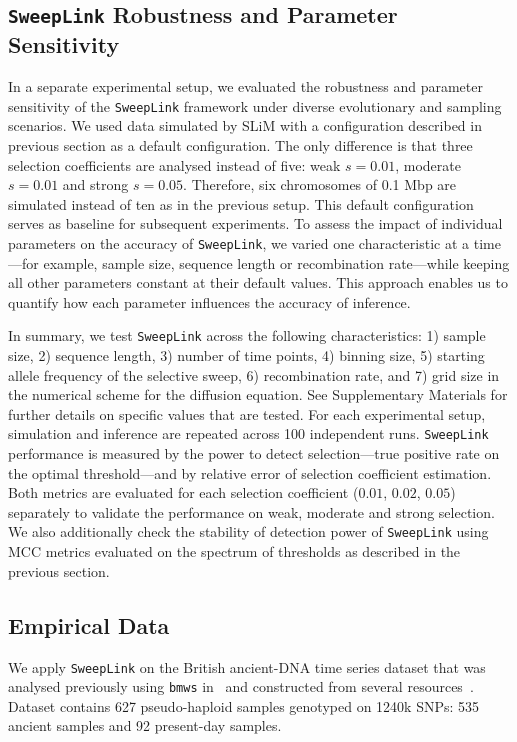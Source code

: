 \documentclass{article}
\newcommand{\SweepLink}{\texttt{SweepLink}\xspace}
\newcommand{\bmws}{\texttt{bmws}\xspace}
\begin{document}
\subsection{\SweepLink Robustness and Parameter Sensitivity}

In a separate experimental setup, we evaluated the robustness and parameter sensitivity of the \SweepLink framework under diverse evolutionary and sampling scenarios.
We used data simulated by SLiM with a configuration described in previous section as a default configuration.
The only difference is that three selection coefficients are analysed instead of five: weak $s=0.01$, moderate $s=0.01$ and strong $s=0.05$.
Therefore, six chromosomes of 0.1 Mbp are simulated instead of ten as in the previous setup.
This default configuration serves as baseline for subsequent experiments.
To assess the impact of individual parameters on the accuracy of \texttt{SweepLink}, we varied one characteristic at a time---for example, sample size, sequence length or recombination rate---while keeping all other parameters constant at their default values.
This approach enables us to quantify how each parameter influences the accuracy of inference.

In summary, we test \texttt{SweepLink} across the following characteristics: 1) sample size, 2) sequence length, 3) number of time points, 4) binning size, 5) starting allele frequency of the selective sweep, 6) recombination rate, and 7) grid size in the numerical scheme for the diffusion equation.
See Supplementary Materials for further details on specific values that are tested.
For each experimental setup, simulation and inference are repeated across 100 independent runs.
\SweepLink performance is measured by the power to detect selection---true positive rate on the optimal threshold---and by relative error of selection coefficient estimation.
Both metrics are evaluated for each selection coefficient ($0.01$, $0.02$, $0.05$) separately to validate the performance on weak, moderate and strong selection.
We also additionally check the stability of detection power of \SweepLink using MCC metrics evaluated on the spectrum of thresholds as described in the previous section.

\subsection{Empirical Data}
We apply \SweepLink on the British ancient-DNA time series dataset that was analysed previously using \bmws in~\citet{mathieson2022} and constructed from several resources~\citep[version 44.3]{mallick2024}\citep{martiniano2016,schiffels2016,olalde2018,brace2019,margaryan2020,patterson2022,1000G2015}.
Dataset contains 627 pseudo-haploid samples genotyped on 1240k SNPs: 535 ancient samples and 92 present-day samples.
\end{document}
